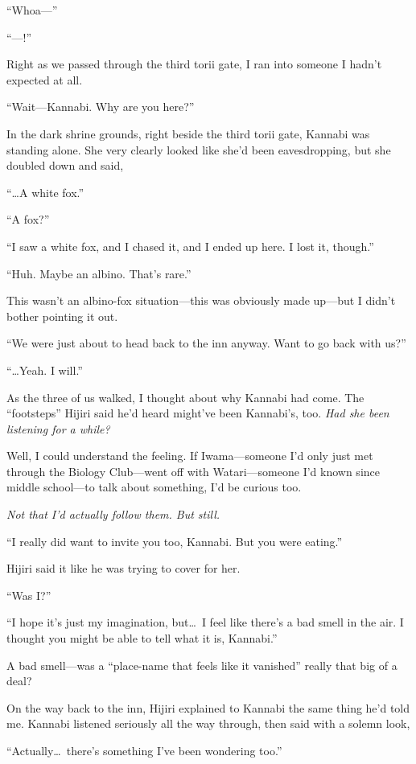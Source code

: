 \documentclass[
    a4paper,
    12pt,
    twoside,
    openany,
    UTF8,
    fontset=windows
]{ctexbook}
\begin{document}
``Whoa---''

``---!''

Right as we passed through the third torii gate, I ran into someone I hadn't expected at all.

``Wait---Kannabi. Why are you here?''

In the dark shrine grounds, right beside the third torii gate, Kannabi was standing alone. She very clearly looked like she'd been eavesdropping, but she doubled down and said,

``\dots A white fox.''

``A fox?''

``I saw a white fox, and I chased it, and I ended up here. I lost it, though.''

``Huh. Maybe an albino. That's rare.''

This wasn't an albino-fox situation---this was obviously made up---but I didn't bother pointing it out.

``We were just about to head back to the inn anyway. Want to go back with us?''

``\dots Yeah. I will.''

As the three of us walked, I thought about why Kannabi had come. The ``footsteps'' Hijiri said he'd heard might've been Kannabi's, too. \textit{Had she been listening for a while?}

Well, I could understand the feeling. If Iwama---someone I'd only just met through the Biology Club---went off with Watari---someone I'd known since middle school---to talk about something, I'd be curious too.

\textit{Not that I'd actually follow them. But still.}

``I really did want to invite you too, Kannabi. But you were eating.''

Hijiri said it like he was trying to cover for her.

``Was I?''

``I hope it's just my imagination, but\dots\ I feel like there's a bad smell in the air. I thought you might be able to tell what it is, Kannabi.''

A bad smell---was a ``place-name that feels like it vanished'' really that big of a deal?

On the way back to the inn, Hijiri explained to Kannabi the same thing he'd told me. Kannabi listened seriously all the way through, then said with a solemn look,

``Actually\dots\ there's something I've been wondering too.''
\end{document}

